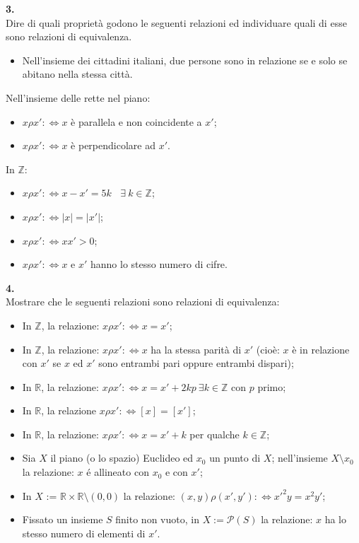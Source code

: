\documentclass[italian,a4paper,11pt]
{article}
\newcommand{\Z}{\mathbb Z}
\newcommand{\R}{\mathbb{R}}
\newcommand{\sse}{\Leftrightarrow}
\begin{document}
\vspace{0.4cm}
\noindent
\begin{Ex}\textbf{ 3.}\\
Dire di quali propriet\`a godono le seguenti relazioni ed individuare quali di esse sono relazioni di equivalenza.
\begin{itemize}
	\item Nell'insieme dei cittadini italiani, due persone sono in relazione se e solo se abitano nella stessa citt\`a. \end{itemize}
Nell'insieme delle rette nel piano:
	\begin{itemize}
	\item $x\rho x':\sse x$ \`e parallela e non coincidente a $x'$;
	\item $x\rho x':\sse x$ \`e perpendicolare ad $x'$.
	\end{itemize}
In $\Z$:
	\begin{itemize}
	\item $x\rho x':\sse x-x'=5k\ \ \ \ \exists \ k\in \Z$;
	\item $x\rho x':\sse |x|=|x'|$;
	\item $x\rho x':\sse xx'>0$;
	\item $x\rho x':\sse x$ e $x'$ hanno lo stesso numero di cifre.


\end{itemize}
\end{Ex}

\vspace{0.4cm}
\noindent
\begin{Ex}\textbf{ 4.}\\
Mostrare che le seguenti relazioni sono relazioni di equivalenza:
\begin{itemize}
\item In $\Z$, la relazione: $x\rho x':\sse x=x'$;
\item In $\Z$, la relazione: $x\rho x' :\sse x$ ha la stessa parit\`a di $x'$ (cio\`e: $x$ \`e in relazione con $x'$ se $x$ ed $x'$ sono entrambi pari oppure entrambi dispari);
\item In $\R$, la relazione: $x\rho x' :\sse x=x'+2kp \  \exists k \in\Z$ con $p$ primo;
\item In $\R$, la relazione $x\rho x':\sse [x] = [x']$;
\item In $\R$, la relazione: $x \rho x':\sse x= x' + k$ per qualche $k\in \Z$;
\item Sia $X$ il piano (o lo spazio) Euclideo ed $x_0$ un punto di $X$; nell'insieme $X \setminus{x_0}$ la relazione: $x$ \'e allineato con $x_0$ e con $x'$;
\item In $X$ := $\R\times\R\setminus{(0,0)}$ la relazione: $(x,y) \rho (x', y'):\sse  x'^2y = x^2y'$;
\item Fissato un insieme $S$ finito non vuoto, in $X:=\mathcal{P}(S)$ la relazione: $x$ ha lo stesso numero di elementi di $x'$.

\end{itemize}
\end{Ex}
\end{document}
